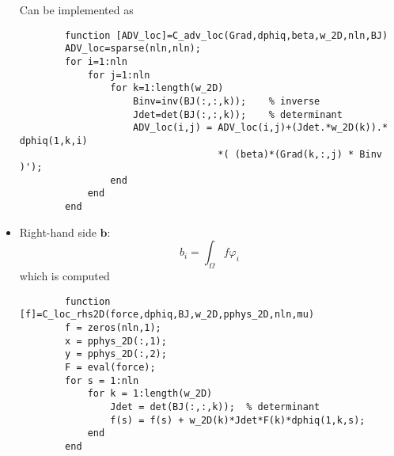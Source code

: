 \documentclass[a4paper,11pt]{article}
\theoremstyle{break}
\newcommand{\vect}[1]{\textbf{#1}}
\let\phi\varphi
\numberwithin{equation}{section}
\begin{document}
\begin{itemize}
    Can be implemented as 
    \begin{verbatim}
        function [ADV_loc]=C_adv_loc(Grad,dphiq,beta,w_2D,nln,BJ)
        ADV_loc=sparse(nln,nln);
        for i=1:nln
            for j=1:nln
                for k=1:length(w_2D)
                    Binv=inv(BJ(:,:,k));    % inverse
                    Jdet=det(BJ(:,:,k));    % determinant 
                    ADV_loc(i,j) = ADV_loc(i,j)+(Jdet.*w_2D(k)).* dphiq(1,k,i)
                                   *( (beta)*(Grad(k,:,j) * Binv )');
                end
            end
        end
    \end{verbatim}
    \item Right-hand side \(\vect{b}\):
    \[
        b_i = \int_\Omega f\phi_i
    \]
    which is computed 
    \begin{verbatim}
        function [f]=C_loc_rhs2D(force,dphiq,BJ,w_2D,pphys_2D,nln,mu)
        f = zeros(nln,1);
        x = pphys_2D(:,1);
        y = pphys_2D(:,2);
        F = eval(force);
        for s = 1:nln
            for k = 1:length(w_2D)
                Jdet = det(BJ(:,:,k));  % determinant 
                f(s) = f(s) + w_2D(k)*Jdet*F(k)*dphiq(1,k,s);
            end    
        end
    \end{verbatim}
\end{itemize}
\end{document}
